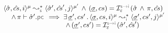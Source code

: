 \begin{lemma}\label{lemma:full:soundiness}
$$
\begin{array}{l} 
\transabssemrule{\sstate, \scs, i}{\sstate', \scs', j}{\mode}{\mode'}{\symbolic} \, \wedge \, 
     (\istate, \cs) = \interpret{\symbinst}{\senv}(\sstate \, \wedge \, \pc, \scs)  \\ \quad \, \wedge \, 
     \pc \vdash \sstate'.\pcsel 
     \implies 
        \exists \, \istate', \cs' \, . \, \transabssemrule{\istate, \cs, i}{\istate', \cs', j}{\mode}{\mode'}{\instrumented} \\ \qquad \qquad \qquad \qquad \quad
         \, \wedge \, 
            (\istate', \cs') = \interpret{\symbinst}{\senv}(\sstate', \scs')  
 \end{array}
$$
\end{lemma}
